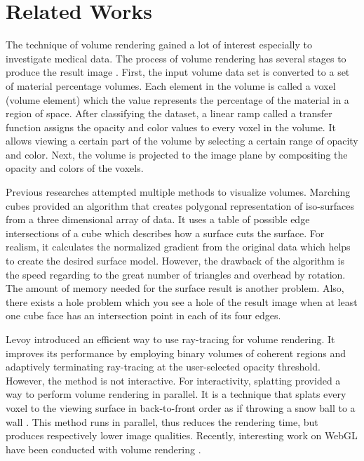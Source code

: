 \documentclass[annual]{acmsiggraph}
\begin{document}
\section{Related Works}
The technique of volume rendering gained a lot of interest especially to investigate medical data. The process of volume rendering has several stages to produce the result image \cite{drebin:1988}. First, the input volume data set is converted to a set of material percentage volumes. Each element in the volume is called a voxel (volume element) which the value represents the percentage of the material in a region of space. After classifying the dataset, a linear ramp called a transfer function assigns the opacity and color values to every voxel in the volume. It allows viewing a certain part of the volume by selecting a certain range of opacity and color. Next, the volume is projected to the image plane by compositing the opacity and colors of the voxels. 

Previous researches attempted multiple methods to visualize volumes. Marching cubes \cite{lorensen:1987} provided an algorithm that creates polygonal representation of iso-surfaces from a three dimensional array of data. It uses a table of possible edge intersections of a cube which describes how a surface cuts the surface. For realism, it calculates the normalized gradient from the original data which helps to create the desired surface model. However, the drawback of the algorithm is the speed regarding to the great number of triangles and overhead by rotation. The amount of memory needed for the surface result is another problem. Also, there exists a hole problem which you see a hole of the result image when at least one cube face has an intersection point in each of its four edges.

Levoy\cite{levoy:1990} introduced an efficient way to use ray-tracing for volume rendering. It improves its performance by employing binary volumes of coherent regions and adaptively terminating ray-tracing at the user-selected opacity threshold. However, the method is not interactive.
For interactivity, splatting provided a way to perform volume rendering in parallel. It is a technique that splats every voxel to the viewing surface in back-to-front order as if throwing a snow ball to a wall \cite{westover:1991}. This method runs in parallel, thus reduces the rendering time, but produces respectively lower image qualities. 
Recently, interesting work on WebGL have been conducted with volume rendering \cite{anatomical:2011}. 
\end{document}
